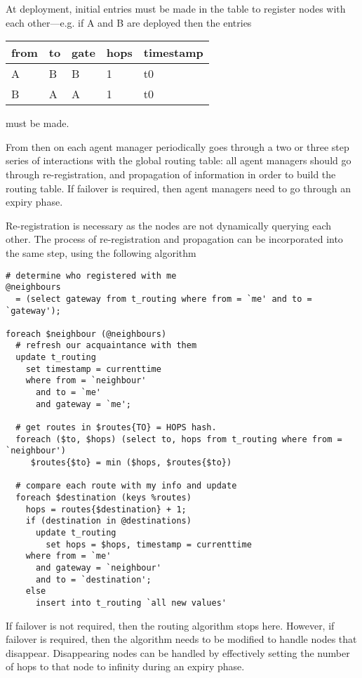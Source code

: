 \documentclass{cmspaper}
\begin{document}
At deployment, initial entries must be made in the table to register
nodes with each other---e.g. if A and B are deployed then the entries

\begin{tabular}{lllll}
from	& to	& gate	& hops	& timestamp	\\ \hline
A	& B	& B	& 1	& t0		\\
B	& A	& A	& 1	& t0
\end{tabular}

must be made.

From then on each agent manager periodically goes through a two or
three step series of interactions with the global routing table: all
agent managers should go through re-registration, and propagation of
information in order to build the routing table.  If failover is
required, then agent managers need to go through an expiry phase.

Re-registration is necessary as the nodes are not dynamically querying
each other.  The process of re-registration and propagation can be
incorporated into the same step, using the following algorithm

\begin{verbatim}
# determine who registered with me
@neighbours
  = (select gateway from t_routing where from = `me' and to = `gateway');

foreach $neighbour (@neighbours)
  # refresh our acquaintance with them
  update t_routing
    set timestamp = currenttime
    where from = `neighbour'
      and to = `me'
      and gateway = `me';

  # get routes in $routes{TO} = HOPS hash.
  foreach ($to, $hops) (select to, hops from t_routing where from = `neighbour')
     $routes{$to} = min ($hops, $routes{$to})

  # compare each route with my info and update
  foreach $destination (keys %routes)
    hops = routes{$destination} + 1;
    if (destination in @destinations)
      update t_routing
        set hops = $hops, timestamp = currenttime
	where from = `me'
	  and gateway = `neighbour'
	  and to = `destination';
    else
      insert into t_routing `all new values'
\end{verbatim}

If failover is not required, then the routing algorithm stops here.
However, if failover is required, then the algorithm needs to be
modified to handle nodes that disappear.  Disappearing nodes can be
handled by effectively setting the number of hops to that node to
infinity during an expiry phase.
\end{document}
